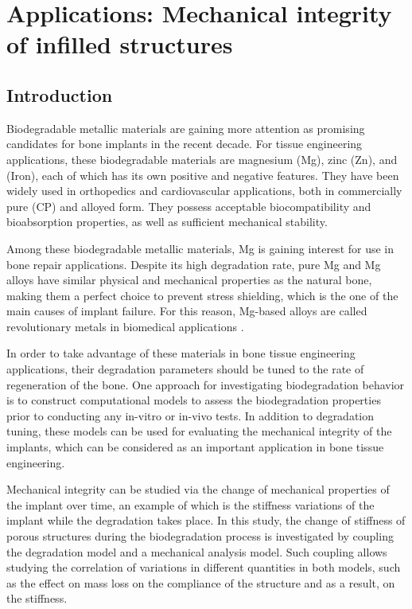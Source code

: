 \chapter{Applications: Mechanical integrity of infilled structures}\label{ch:infill}

\section{Introduction}

Biodegradable metallic materials are gaining more attention as promising candidates for bone implants in the recent decade. For tissue engineering applications, these biodegradable materials are magnesium (Mg), zinc (Zn), and (Iron), each of which has its own positive and negative features. They have been widely used in orthopedics and cardiovascular applications, both in commercially pure (CP) and alloyed form. They possess acceptable biocompatibility and bioabsorption properties, as well as sufficient mechanical stability. 

Among these biodegradable metallic materials, Mg is gaining interest for use in bone repair applications. Despite its high degradation rate, pure Mg and Mg alloys have similar physical and mechanical properties as the natural bone, making them a perfect choice to prevent stress shielding, which is the one of the main causes of implant failure. For this reason, Mg-based alloys are called revolutionary metals in biomedical applications \cite{Shuai2019}. 

In order to take advantage of these materials in bone tissue engineering applications, their degradation parameters should be tuned to the rate of regeneration of the bone. One approach for investigating biodegradation behavior is to construct computational models to assess the biodegradation properties prior to conducting any in-vitro or in-vivo tests. In addition to degradation tuning, these models can be used for evaluating the mechanical integrity of the implants, which can be considered as an important application in bone tissue engineering. 

Mechanical integrity can be studied via the change of mechanical properties of the implant over time, an example of which is the stiffness variations of the implant while the degradation takes place. In this study, the change of stiffness of porous structures during the biodegradation process is investigated by coupling the degradation model and a mechanical analysis model. Such coupling allows studying the correlation of variations in different quantities in both models, such as the effect on mass loss on the compliance of the structure and as a result, on the stiffness. 

